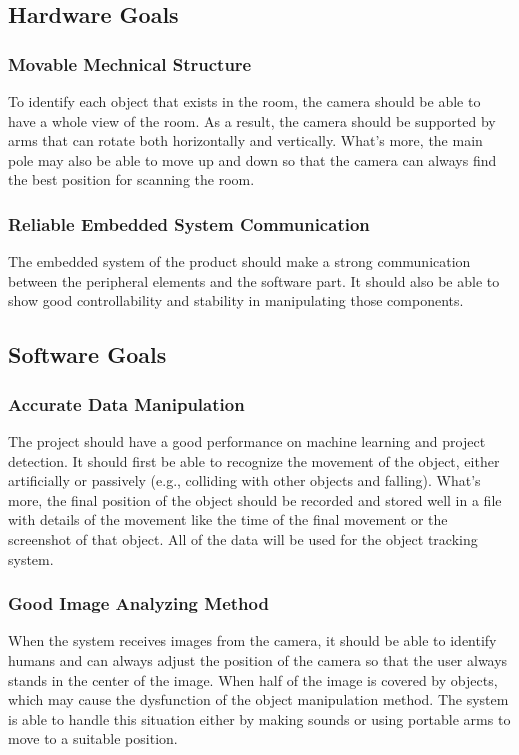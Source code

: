 \documentclass{article}
\begin{document}
\subsection{Hardware Goals}
\subsubsection{Movable Mechnical Structure}
To identify each object that exists in the room, the camera should be able to have a whole view of the room. As a result, the camera should be supported by arms that can rotate both horizontally and vertically. What’s more, the main pole may also be able to move up and down so that the camera can always find the best position for scanning the room.
\subsubsection{Reliable Embedded System Communication}
The embedded system of the product should make a strong communication between the peripheral elements and the software part. It should also be able to show good controllability and stability in manipulating those components.
\subsection{Software Goals}
\subsubsection{Accurate Data Manipulation}
The project should have a good performance on machine learning and project detection. It should first be able to recognize the movement of the object, either artificially or passively (e.g., colliding with other objects and falling). What’s more, the final position of the object should be recorded and stored well in a file with details of the movement like the time of the final movement or the screenshot of that object. All of the data will be used for the object tracking system.
\subsubsection{Good Image Analyzing Method}
When the system receives images from the camera, it should be able to identify humans and can always adjust the position of the camera so that the user always stands in the center of the image. When half of the image is covered by objects, which may cause the dysfunction of the object manipulation method. The system is able to handle this situation either by making sounds or using portable arms to move to a suitable position. 
\end{document}
